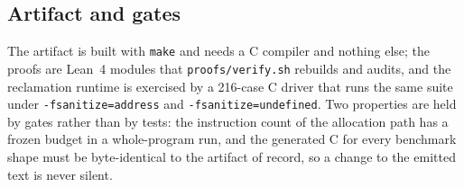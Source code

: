 \subsection{Artifact and gates}
\label{sec:impl-artifact}

The artifact is built with \texttt{make} and needs a C compiler and nothing else; the proofs
are Lean~4 modules that \texttt{proofs/verify.sh} rebuilds and audits, and the reclamation runtime is
exercised by a 216-case C driver that runs the same suite under \texttt{-fsanitize=address} and
\texttt{-fsanitize=undefined}.  Two properties are held by gates rather than by tests: the
instruction count of the allocation path has a frozen budget in a whole-program run, and the
generated C for every benchmark shape must be byte-identical to the artifact of record, so a
change to the emitted text is never silent.
